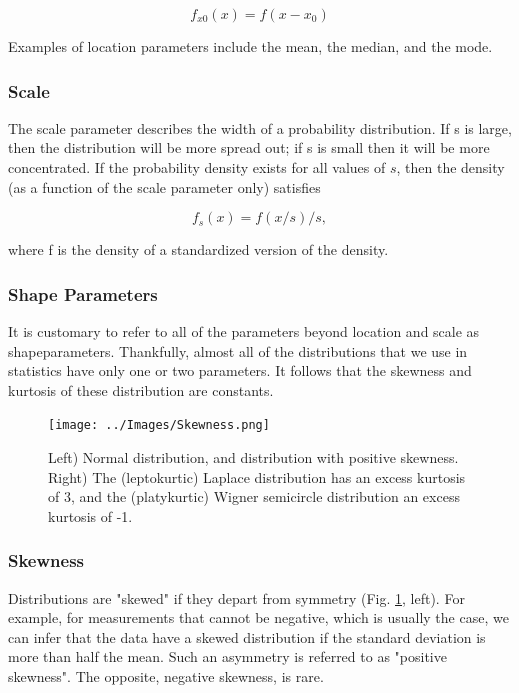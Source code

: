\begin{equation*}
  f_{x0}(x)=f(x-x_0)
\end{equation*}

Examples of location parameters include the mean, the median, and the mode.

\subsubsection{Scale}

The \gls{scale} parameter describes the width of a probability distribution.  If s is large, then the distribution will be more spread out; if s is small then it will be more concentrated. If the probability density exists for all values of $s$, then the density (as a function of the scale parameter only) satisfies

\begin{equation*}
   f_s(x) = f(x/s)/s,
\end{equation*}

where f is the density of a standardized version of the density.

\subsubsection{Shape Parameters}

It is customary to refer to all of the parameters beyond location and scale as \glspl{shapeparameter}. Thankfully, almost all of the distributions that we use in statistics have only one or two parameters. It follows that the \gls{skewness} and \gls{kurtosis} of these distribution are constants.

\begin{figure}
  \centering
  \texttt{[image: ../Images/Skewness.png]}\\
  \caption{Left) Normal distribution, and distribution with positive skewness. Right) The (leptokurtic) Laplace distribution has an excess kurtosis of 3, and the (platykurtic) Wigner semicircle distribution an excess kurtosis of -1.}\label{fig:skewkurtosis}
\end{figure}

\subsubsection{Skewness}

Distributions are "skewed" if they depart from symmetry (Fig. \ref{fig:skewkurtosis}, left). For example, for measurements that cannot be negative, which is usually the case, we can infer that the data have a skewed distribution if the standard deviation is more than half the mean. Such an asymmetry is referred to as "positive skewness". The opposite, negative skewness, is rare.

